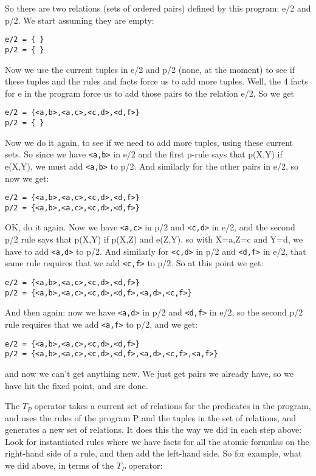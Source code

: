 So there are two relations (sets of ordered pairs) defined by this
program: e/2 and p/2.  We start assuming they are empty:
\begin{verbatim}
e/2 = { }
p/2 = { }
\end{verbatim}
Now we use the current tuples in e/2 and p/2 (none, at the moment) to
see if these tuples and the rules and facts force us to add more
tuples.  Well, the 4 facts for e in the program force us to add those
pairs to the relation e/2.  So we get
\begin{verbatim}
e/2 = {<a,b>,<a,c>,<c,d>,<d,f>}
p/2 = { }
\end{verbatim}
Now we do it again, to see if we need to add more tuples, using these
current sets.  So since we have \verb|<a,b>| in e/2 and the first p-rule says
that p(X,Y) if e(X,Y), we must add \verb|<a,b>| to p/2.  And similarly for
the other pairs in e/2, so now we get:
\begin{verbatim}
e/2 = {<a,b>,<a,c>,<c,d>,<d,f>}
p/2 = {<a,b>,<a,c>,<c,d>,<d,f>}
\end{verbatim}
OK, do it again.  Now we have \verb|<a,c>| in p/2 and \verb|<c,d>| in e/2, and the
second p/2 rule says that p(X,Y) if p(X,Z) and e(Z,Y).  so with
X=a,Z=c and Y=d, we have to add \verb|<a,d>| to p/2.  And similarly for \verb|<c,d>|
in p/2 and \verb|<d,f>| in e/2, that same rule requires that we add \verb|<c,f>| to
p/2.  So at this point we get:
\begin{verbatim}
e/2 = {<a,b>,<a,c>,<c,d>,<d,f>}
p/2 = {<a,b>,<a,c>,<c,d>,<d,f>,<a,d>,<c,f>}
\end{verbatim}
And then again: now we have \verb|<a,d>| in p/2 and \verb|<d,f>| in e/2, so the
second p/2 rule requires that we add \verb|<a,f>| to p/2, and we get:
\begin{verbatim}
e/2 = {<a,b>,<a,c>,<c,d>,<d,f>}
p/2 = {<a,b>,<a,c>,<c,d>,<d,f>,<a,d>,<c,f>,<a,f>}
\end{verbatim}
and now we can't get anything new.  We just get pairs we already have,
so we have hit the fixed point, and are done.

The $T_P$ operator takes a current set of relations for the predicates
in the program, and uses the rules of the program P and the tuples in
the set of relations, and generates a new set of relations.  It does
this the way we did in each step above: Look for instantiated rules
where we have facts for all the atomic formulas on the right-hand side
of a rule, and then add the left-hand side.  So for example, what we
did above, in terms of the $T_P$ operator:

